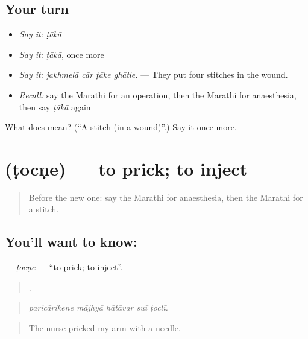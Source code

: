\subsection*{Your turn}
\begin{itemize}
\raggedright
  \item \emph{Say it:} \emph{ṭākā}
  \item \emph{Say it:} \emph{ṭākā}, once more
  \item \emph{Say it:} \emph{jakhmelā cār ṭāke ghātle.} — They put four stitches in the wound.
  \item \emph{Recall:} say the Marathi for an operation, then the Marathi for anaesthesia, then say \emph{ṭākā} again
\end{itemize}

\begin{tcolorbox}[breakable,colback=teal!4,colframe=teal!35!black,title={Before you move on}]
What does  mean? (\textquotedblleft{}A stitch (in a wound)\textquotedblright{}.) Say it once more.
\end{tcolorbox}
\section[\texorpdfstring{\mr{टोचणे} (ṭocṇe)}{टोचणे (ṭocṇe)}]{ (ṭocṇe) — to prick; to inject}

\label{lesson:MR-C489-tocne}



\begin{quote}
Before the new one: say the Marathi for anaesthesia, then the Marathi for a stitch.
\end{quote}

\subsection*{You'll want to know: }
\textbf{} — \emph{ṭocṇe} — \textquotedblleft{}to prick; to inject\textquotedblright{}.

\begin{quote}
    .
\end{quote}

\begin{quote}
\emph{paricārikene mājhyā hātāvar suī ṭoclī.}
\end{quote}

\begin{quote}
The nurse pricked my arm with a needle.
\end{quote}

